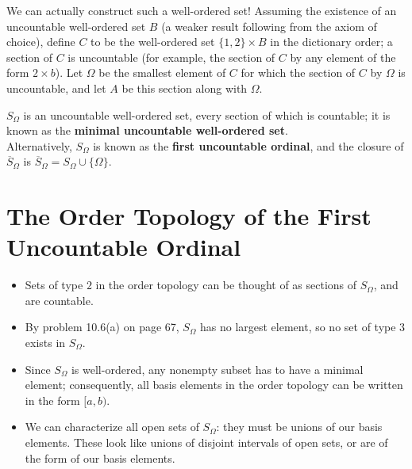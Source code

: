 \documentclass[11pt]{article}
\begin{document}
We can actually construct such a well-ordered set! Assuming the existence of an uncountable well-ordered set $B$ (a weaker result following from the axiom of choice), define $C$ to be the well-ordered set $\{1, 2\} \times B$ in the dictionary order; a section of $C$ is uncountable (for example, the section of $C$ by any element of the form $2 \times b$). Let $\Omega$ be the smallest element of $C$ for which the section of $C$ by $\Omega$ is uncountable, and let $A$ be this section along with $\Omega$.

\begin{definition}
$S_\Omega$ is an uncountable well-ordered set, every section of which is countable; it is known as the \textbf{minimal uncountable well-ordered set}. \\

Alternatively, $S_\Omega$ is known as the \textbf{first uncountable ordinal}, and the closure of $\overline{S}_\Omega$ is $\overline{S}_\Omega = S_\Omega \cup \{ \Omega\}$.
\end{definition}

\section{The Order Topology of the First Uncountable Ordinal}

\begin{itemize}
    \item Sets of type $2$ in the order topology can be thought of as sections of $S_{\Omega}$, and are countable.
    \item By problem 10.6(a) on page 67, $S_{\Omega}$ has no largest element, so no set of type $3$ exists in $S_{\Omega}$.
    \item Since $S_\Omega$ is well-ordered, any nonempty subset has to have a minimal element; consequently, all basis elements in the order topology can be written in the form $[a,b)$.  
    \item We can characterize all open sets of $S_\Omega$: they must be unions of our basis elements. These look like unions of disjoint intervals of open sets, or are of the form of our basis elements.
\end{itemize}
\end{document}
